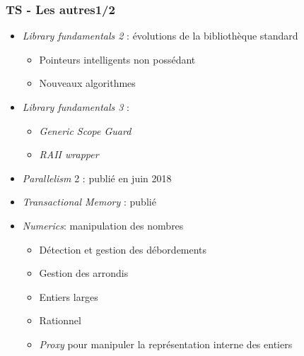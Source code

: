 \documentclass[C++.tex]{subfiles}
\begin{document}
\begin{frame}
	\frametitle{TS - Les autres\titlehfill{}1/2}
	\begin{itemize}
		\item \textit{Library fundamentals 2} : évolutions de la bibliothèque standard
		\begin{itemize}
			\item Pointeurs intelligents non possédant
			\item Nouveaux algorithmes
		\end{itemize}
		\item \textit{Library fundamentals 3} :
		\begin{itemize}
			\item \textit{Generic Scope Guard}
			\item \textit{RAII wrapper}
		\end{itemize}
		\item \textit{Parallelism} 2 : publié en juin 2018
		\item \textit{Transactional Memory} : publié
		\item \textit{Numerics}: manipulation des nombres
		\begin{itemize}
			\item Détection et gestion des débordements
			\item Gestion des arrondis
			\item Entiers larges
			\item Rationnel
			\item \textit{Proxy} pour manipuler la représentation interne des entiers
		\end{itemize}
	\end{itemize}
\end{frame}
\end{document}

